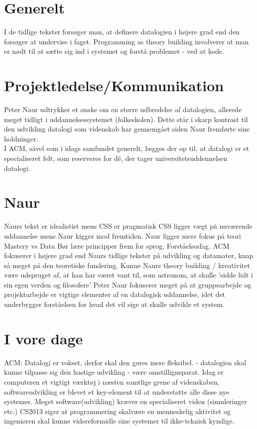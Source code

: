 \section{Generelt}
I de tidlige tekster forsøger man, at definere datalogien i højere grad end den forsøger at undervise i faget.
Programming as theory building involverer at man er nødt til at sætte sig ind i systemet og forstå problemet - ved at
kode.



\section{Projektledelse/Kommunikation}
Peter Naur udtrykker et ønske om en større udbredelse af datalogien, allerede
meget tidligt i uddannelsessystemet (folkeskolen). Dette står i skarp kontrast
til den udvikling datalogi som videnskab har gennemgået siden Naur fremførte sine
holdninger.\\
I ACM, såvel som i idags samfundet generelt, lægges der op til, at datalogi er et
specialiseret felt, som reserveres for dé, der tager universitetsuddennelsen
datalogi.

\section{Naur}
Naurs tekst er idealistist mens CSS er pragmatisk
CSS ligger vægt på nuværende uddannelse mens Naur kigger mod fremtiden.
Naur ligger mere fokus på teori
Mastery vs Data
Bør lære principper frem for sprog. Forståelsesfag.
ACM fokuserer i højere grad end Naurs tidlige tekster på udvikling og datamater, knap så
meget på den teoretiske fundering.
Kunne Naurs theory building / kreativitet være udspruget af, at han har været vant til, som astronom, at skulle
'sidde lidt i sin egen verden og filosofere'
Peter Naur fokuserer meget på at gruppearbejde og projektarbejde er vigtige elementer af en datalogisk uddannelse,
idet det underbygger forståelsen for hvad det vil sige at skulle udvikle et system.


\section{I vore dage}
ACM: Datalogi er vokset, derfor skal den gøres mere fleksibel.
        - datalogien skal kunne tilpasse sig den hastige udvikling - være omstillignsparat.
Idag er computeren et vigtigt værktøj i næsten samtlige grene af videnskaben,
softwareudvikling er blevet et key-element til at understøtte alle disse nye
systemer.
Meget software(udvikling) kræver en specialiseret viden (simuleringer etc.)
CS2013 siger at programmering skalvære en menneskelig aktivitet og ingeniøren skal kunne videreformidle sine systemer til ikke-teknisk kyndige.

